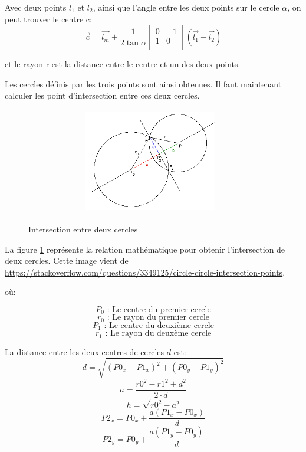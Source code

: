 \documentclass[12pt]{article}
\begin{document}
Avec deux points $l_1$ et $l_2$, ainsi que l'angle entre les deux points sur le cercle $\alpha$, on peut trouver le centre c:
\[  \vec{c} = \vec{l_m} + \frac{1}{2\tan{\alpha}}
\begin{bmatrix}
    0 & -1 \\
    1 & 0 \\
\end{bmatrix} (\vec{l_1} - \vec{l_2})
\]

et le rayon r est la distance entre le centre et un des deux points.

Les cercles définis par les trois points sont ainsi obtenues.
Il faut maintenant calculer les point d'intersection entre ces deux cercles.

\begin{figure}[ht]
 \begin{center}
  \begin{tabular}{c}
    \includegraphics[width=0.55\textwidth]{circle_intersection.png}
  \end{tabular}
 \end{center}
\vspace{-0.25in}
 \caption{Intersection entre deux cercles}
    \label{circle_intersection}
\end{figure}

La figure \ref{circle_intersection} repr\'esente la relation math\'ematique pour obtenir l'intersection de deux cercles.
Cette image vient de \url{https://stackoverflow.com/questions/3349125/circle-circle-intersection-points}.

o\`u:

   \[ P_0 \text{ : Le centre du premier cercle} \]
   \[ r_0 \text{ : Le rayon du premier cercle} \]
   \[ P_1 \text{ : Le centre du deuxi\`eme cercle} \]
   \[ r_1 \text{ : Le rayon du deux\`eme cercle} \]


La distance entre les deux centres de cercles $d$ est:
\[ d = \sqrt{(P0_x - P1_x)^2 + (P0_y - P1_y)^2} \]
\[ a = \frac{r0^2 - r1^2 + d^2}{2 \cdot d} \]
\[ h = \sqrt{r0^2 - a^2} \]
\[ P2_x = P0_x + \frac{a(P1_x - P0_x)}{d} \]
\[ P2_y = P0_y + \frac{a(P1_y - P0_y)}{d} \]
\end{document}
